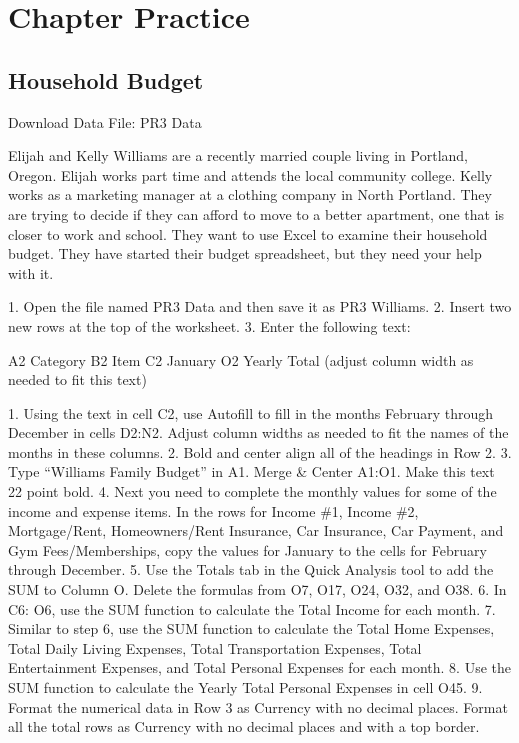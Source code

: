 \section{Chapter Practice}




\subsection{Household Budget}

Download Data File: PR3 Data

Elijah and Kelly Williams are a recently married couple living in Portland, Oregon. Elijah works part
time and attends the local community college. Kelly works as a marketing manager at a clothing
company in North Portland. They are trying to decide if they can afford to move to a better
apartment, one that is closer to work and school. They want to use Excel to examine their household
budget. They have started their budget spreadsheet, but they need your help with it.

1. Open the file named PR3 Data and then save it as PR3 Williams.
2. Insert two new rows at the top of the worksheet.
3. Enter the following text:

A2        Category
B2        Item
C2        January
O2        Yearly Total (adjust column width as needed to fit this text)

1. Using the text in cell C2, use Autofill to fill in the months February through December in cells
D2:N2. Adjust column widths as needed to fit the names of the months in these columns.
2. Bold and center align all of the headings in Row 2.
3. Type “Williams Family Budget” in A1. Merge \& Center A1:O1. Make this text 22 point bold.
4. Next you need to complete the monthly values for some of the income and expense items. In the
rows for Income \#1, Income \#2, Mortgage/Rent, Homeowners/Rent Insurance, Car Insurance,
Car Payment, and Gym Fees/Memberships, copy the values for January to the cells for February
through December.
5. Use the Totals tab in the Quick Analysis tool to add the SUM to Column O. Delete the formulas
from O7, O17, O24, O32, and O38.
6. In C6: O6, use the SUM function to calculate the Total Income for each month.
7. Similar to step 6, use the SUM function to calculate the Total Home Expenses, Total Daily
Living Expenses, Total Transportation Expenses, Total Entertainment Expenses, and Total
Personal Expenses for each month.
8. Use the SUM function to calculate the Yearly Total Personal Expenses in cell O45.
9. Format the numerical data in Row 3 as Currency with no decimal places. Format all the total
rows as Currency with no decimal places and with a top border.


